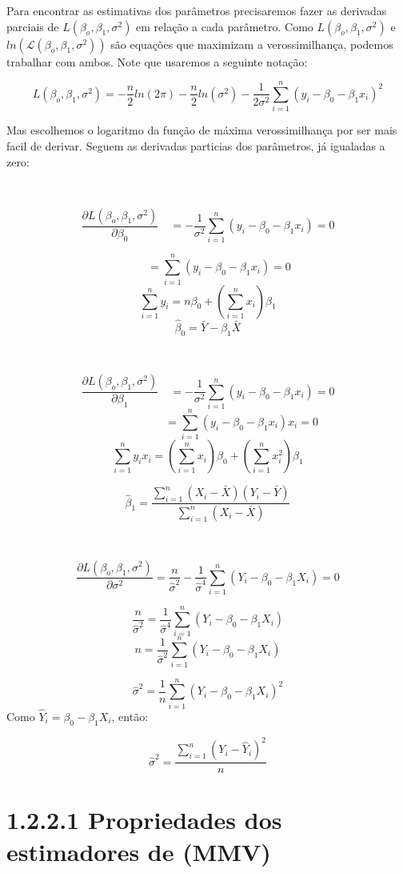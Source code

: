 \documentclass[
]{article}
\begin{document}
Para encontrar as estimativas dos parâmetros precisaremos fazer as
derivadas parciais de \(L(\beta_o, \beta_1, \sigma^2)\) em relação a
cada parâmetro. Como \(L(\beta_o, \beta_1, \sigma^2)\) e
\(ln(\mathcal{L}(\beta_o, \beta_1, \sigma^2))\) são equações que
maximizam a verossimilhança, podemos trabalhar com ambos. Note que
usaremos a seguinte notação:

\[L(\beta_o, \beta_1, \sigma^2) = -\frac{n}{2} ln( 2\pi) -\frac{n}{2} ln(\sigma^2)-\frac{1}{2\sigma^2}\sum_{i=1}^{n}(y_i-\beta_0-\beta_1x_i)^2\]

Mas escolhemos o logaritmo da função de máxima verossimilhança por ser
mais facil de derivar. Seguem as derivadas particias dos parâmetros, já
igualadas a zero:

~

\[\frac{\partial L(\beta_o, \beta_1, \sigma^2)}{\partial \beta_0}\quad= -\frac{1}{\sigma^2}\sum_{i=1}^{n}(y_i-\beta_0-\beta_1x_i)=0\]

\[\quad\quad=\sum_{i=1}^{n}(y_i-\beta_0-\beta_1x_i)=0\]
\[\sum_{i=1}^{n}y_i=n\beta_0+(\sum_{i=1}^{n}x_i)\beta_1\]
\[\hat{\beta}_0=\bar{Y}-\beta_1\bar{X}\]

~

\[\frac{\partial L(\beta_o, \beta_1, \sigma^2)}{\partial \beta_1} \quad= -\frac{1}{\sigma^2}\sum_{i=1}^{n}(y_i-\beta_0-\beta_1x_i)=0\]
\[\quad\quad\quad\quad\quad\quad=\sum_{i=1}^{n}(y_i-\beta_0-\beta_1x_i)x_i=0\]
\[\sum_{i=1}^{n}y_ix_i=(\sum_{i=1}^{n}x_i)\beta_0+(\sum_{i=1}^{n}x_i^2)\beta_1  \]

\[\hat{\beta}_1 = \frac{\sum_{i=1}^{n}(X_i-\bar{X})(Y_i-\bar{Y})}{\sum_{i=1}^{n}(X_i-\bar{X})}\]

~

\[\frac{\partial L(\beta_o, \beta_1, \sigma^2)}{\partial \sigma^2}=\frac{n}{\hat{\sigma}^2}-\frac{1}{\hat{\sigma}^4}\sum_{i=1}^{n}(Y_i-\beta_0-\beta_1X_i)=0\]

\[\frac{n}{\hat{\sigma}^2}=\frac{1}{\hat{\sigma}^4}\sum_{i=1}^{n}(Y_i-\beta_0-\beta_1X_i)\]
\[n=\frac{1}{\hat{\sigma}^2}\sum_{i=1}^{n}(Y_i-\beta_0-\beta_1X_i)\]

\[\hat{\sigma}^2=\frac{1}{n}\sum_{i=1}^{n}(Y_i-\beta_0-\beta_1X_i)^2\]
Como \(\hat{Y}_i=\beta_0-\beta_1X_i\), então:

\[\hat{\sigma}^2=\frac{\sum_{i=1}^{n}(Y_i-\hat{Y}_i)^2}{n}\]

\hypertarget{propriedades-dos-estimadores-de-mmv}{%
\section{1.2.2.1 Propriedades dos estimadores de
(MMV)}\label{propriedades-dos-estimadores-de-mmv}}
\end{document}
